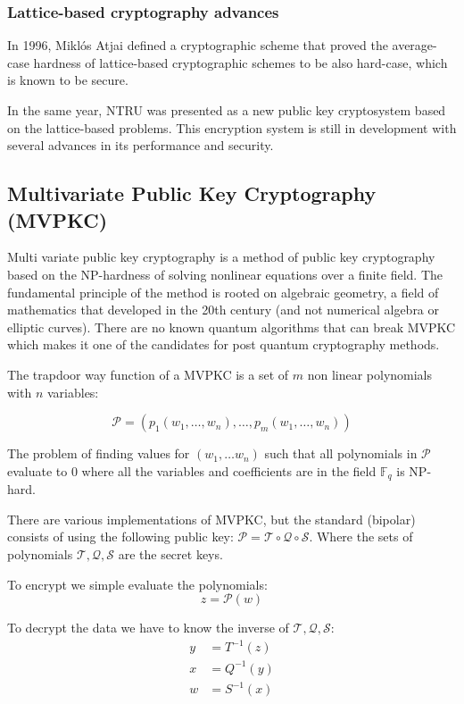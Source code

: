 \subsubsection{Lattice-based cryptography advances}

In 1996, Miklós Atjai defined a cryptographic scheme that proved the
average-case hardness of lattice-based cryptographic schemes to be also
hard-case, which is known to be secure.

In the same year, NTRU was presented as a new public key cryptosystem based on
the lattice-based problems. This encryption system is still in development with
several advances in its performance and security.



\pagebreak
\subsection{Multivariate Public Key Cryptography (MVPKC)}

Multi variate public key cryptography is a method of public key cryptography
based on the NP-hardness of solving nonlinear equations over a finite field.
The fundamental principle of the method is rooted on algebraic geometry, a field
of mathematics that developed in the 20th century (and not numerical algebra or
elliptic curves). There are no known quantum algorithms that can break MVPKC
which makes it one of the candidates for post quantum cryptography methods.
\cite{ding_multivariate_2009}

The trapdoor way function of a MVPKC is a set of $m$ non linear polynomials with
$n$ variables:

$$ \mathcal{P} = (p_1(w_1, \dots, w_n), \dots, p_m(w_1, \dots, w_n))$$

The problem of finding values for $(w_1, \dots w_n)$ such that all polynomials
in $\mathcal{P}$ evaluate to 0 where all the variables and coefficients are in
the field $\mathds{F}_q$ is NP-hard.

There are various implementations of MVPKC, but the standard (bipolar) consists of using
the following public key: $\mathcal{P} = \mathcal{T} \circ \mathcal{Q} \circ \mathcal{S}$.
Where the sets of polynomials $\mathcal{T}, \mathcal{Q}, \mathcal{S}$ are the secret keys.

To encrypt we simple evaluate the polynomials:
\begin{equation}
    z = \mathcal{P}(w)
\end{equation}

To decrypt the data we have to know the inverse of $\mathcal{T}, \mathcal{Q}, \mathcal{S}$:
\begin{align*}
    y &= T^{−1}(z) \\
    x &= Q^{−1}(y) \\
    w &= S^{−1}(x)
\end{align*}

